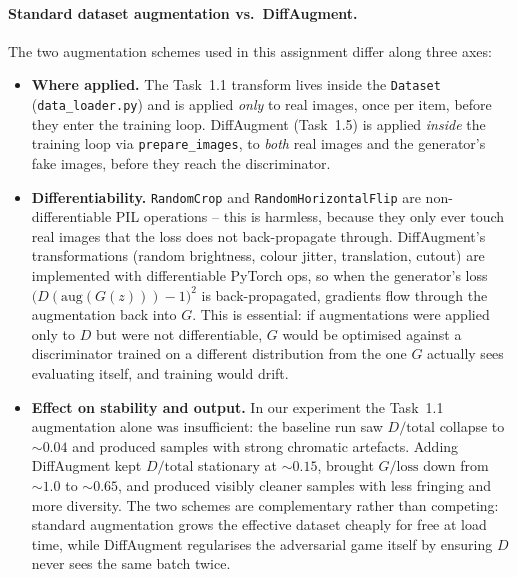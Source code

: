 \documentclass[11pt,a4paper]{article}
\begin{document}
\paragraph{Standard dataset augmentation vs.\ DiffAugment.}
The two augmentation schemes used in this assignment differ along
three axes:
\begin{itemize}[leftmargin=1.5em]
    \item \textbf{Where applied.} The Task~1.1 transform lives inside
          the \texttt{Dataset} (\verb|data_loader.py|) and is applied
          \emph{only} to real images, once per item, before they enter
          the training loop. DiffAugment (Task~1.5) is applied
          \emph{inside} the training loop via \verb|prepare_images|,
          to \emph{both} real images and the generator's fake images,
          before they reach the discriminator.
    \item \textbf{Differentiability.} \verb|RandomCrop| and
          \verb|RandomHorizontalFlip| are non-differentiable PIL
          operations -- this is harmless, because they only ever touch
          real images that the loss does not back-propagate through.
          DiffAugment's transformations (random brightness, colour
          jitter, translation, cutout) are implemented with
          differentiable PyTorch ops, so when the generator's loss
          $\bigl(D(\text{aug}(G(z)))-1\bigr)^{2}$ is back-propagated,
          gradients flow through the augmentation back into $G$.
          This is essential: if augmentations were applied only to $D$
          but were not differentiable, $G$ would be optimised against
          a discriminator trained on a different distribution from the
          one $G$ actually sees evaluating itself, and training would
          drift.
    \item \textbf{Effect on stability and output.} In our experiment
          the Task~1.1 augmentation alone was insufficient: the
          baseline run saw $D/\text{total}$ collapse to
          $\sim\!0.04$ and produced samples with strong chromatic
          artefacts. Adding DiffAugment kept $D/\text{total}$
          stationary at $\sim\!0.15$, brought $G/\text{loss}$ down
          from $\sim\!1.0$ to $\sim\!0.65$, and produced visibly
          cleaner samples with less fringing and more diversity. The
          two schemes are complementary rather than competing:
          standard augmentation grows the effective dataset cheaply
          for free at load time, while DiffAugment regularises the
          adversarial game itself by ensuring $D$ never sees the same
          batch twice.
\end{itemize}
\end{document}
